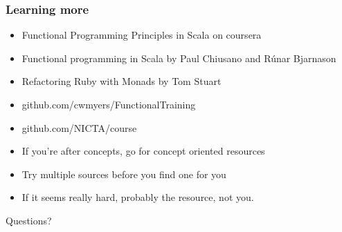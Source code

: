 \documentclass{beamer}
\begin{document}
\begin{frame}
  \frametitle{Learning more}
  \begin{itemize}
    \item Functional Programming Principles in Scala on coursera
    \item Functional programming in Scala by Paul Chiusano and Rúnar Bjarnason
    \item Refactoring Ruby with Monads by Tom Stuart
    \item github.com/cwmyers/FunctionalTraining
    \item github.com/NICTA/course
    \item If you're after concepts, go for concept oriented resources
    \item Try multiple sources before you find one for you
    \item If it seems really hard, probably the resource, not you.
  \end{itemize}
\end{frame}

\begin{frame}
  \begin{center}
    \Huge Questions?
  \end{center}
\end{frame}
\end{document}
